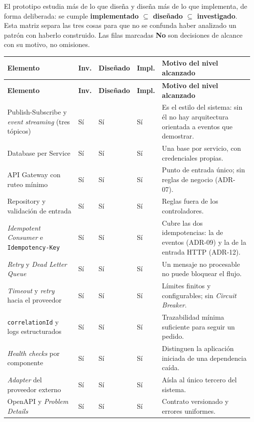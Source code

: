 \documentclass[12pt,a4paper]{article}
\begin{document}
El prototipo estudia más de lo que diseña y diseña más de lo que implementa, de forma deliberada: se cumple \textbf{implementado $\subseteq$ diseñado $\subseteq$ investigado}. Esta matriz separa las tres cosas para que no se confunda haber analizado un patrón con haberlo construido. Las filas marcadas \textbf{No} son decisiones de alcance con su motivo, no omisiones.

\scriptsize
\setlength{\tabcolsep}{3pt}
\begin{longtable}{P{0.26\textwidth} P{0.08\textwidth} P{0.13\textwidth} P{0.12\textwidth} P{0.29\textwidth}}
\toprule
\textbf{Elemento} & \textbf{Inv.} & \textbf{Diseñado} & \textbf{Impl.} & \textbf{Motivo del nivel alcanzado} \\
\midrule
\endfirsthead
\toprule
\textbf{Elemento} & \textbf{Inv.} & \textbf{Diseñado} & \textbf{Impl.} & \textbf{Motivo del nivel alcanzado} \\
\midrule
\endhead
Publish-Subscribe y \textit{event streaming} (tres tópicos) & Sí & Sí & Sí & Es el estilo del sistema: sin él no hay arquitectura orientada a eventos que demostrar. \\
Database per Service & Sí & Sí & Sí & Una base por servicio, con credenciales propias. \\
API Gateway con ruteo mínimo & Sí & Sí & Sí & Punto de entrada único; sin reglas de negocio (ADR-07). \\
Repository y validación de entrada & Sí & Sí & Sí & Reglas fuera de los controladores. \\
\textit{Idempotent Consumer} e \texttt{Idempotency-Key} & Sí & Sí & Sí & Cubre las dos idempotencias: la de eventos (ADR-09) y la de la entrada HTTP (ADR-12). \\
\textit{Retry} y \textit{Dead Letter Queue} & Sí & Sí & Sí & Un mensaje no procesable no puede bloquear el flujo. \\
\textit{Timeout} y \textit{retry} hacia el proveedor & Sí & Sí & Sí & Límites finitos y configurables; sin \textit{Circuit Breaker}. \\
\texttt{correlationId} y logs estructurados & Sí & Sí & Sí & Trazabilidad mínima suficiente para seguir un pedido. \\
\textit{Health checks} por componente & Sí & Sí & Sí & Distinguen la aplicación iniciada de una dependencia caída. \\
\textit{Adapter} del proveedor externo & Sí & Sí & Sí & Aísla al único tercero del sistema. \\
OpenAPI y \textit{Problem Details} & Sí & Sí & Sí & Contrato versionado y errores uniformes. \\

\end{longtable}
\end{document}
